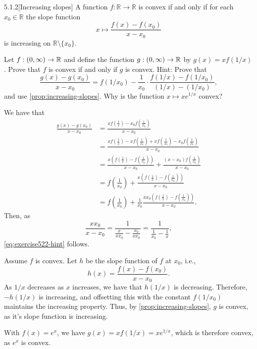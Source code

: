 \begin{manualprop}{5.1.2}[Increasing slopes]\label{prop:increasing-slopes}
  A function $f : \mathbb{R} \to \mathbb{R}$ is convex if and only if for each $x_0 \in \mathbb{R}$ the slope function
  \begin{equation}
    x \mapsto \frac{f(x)-f(x_0)}{x-x_0}
  \end{equation}
  is increasing on $\mathbb{R} \setminus \{x_0\}$.
\end{manualprop}

\begin{exercise}
  Let $f : (0, \infty) \to \mathbb{R}$ and define the function $g : (0, \infty) \to \mathbb{R}$ by $g(x) = x f(1 / x)$.
  Prove that $f$ is convex if and only if $g$ is convex.
  Hint: Prove that
  \begin{equation}\label{eq:exercise522-hint}
    \frac{g(x) - g(x_0)}{x - x_0}
    = f(1 / x_0) - \frac{1}{x_0} \cdot \frac{f(1 / x) - f(1 / x_0)}{(1 / x) - (1 / x_0)},
  \end{equation}
  and use \cref{prop:increasing-slopes}.
  Why is the function $x \mapsto x e^{1/x}$ convex?
\end{exercise}

\begin{solution}
  We have that
  \begin{align*}
    \frac{g(x) - g(x_0)}{x - x_0}
    &= \frac{x f(\frac{1}{x}) - x_0 f(\frac{1}{x_0})}{x - x_0} \\
    &= \frac{x f(\frac{1}{x}) - x f(\frac{1}{x_0}) + x f(\frac{1}{x_0}) - x_0 f(\frac{1}{x_0})}{x - x_0} \\
    &= \frac{x (f(\frac{1}{x}) - f(\frac{1}{x_0}))}{x - x_0} + \frac{(x - x_0) f(\frac{1}{x_0})}{x - x_0} \\
    &= f(\tfrac{1}{x_0}) + \frac{x (f(\frac{1}{x}) - f(\frac{1}{x_0}))}{x - x_0} \\
    &= f(\tfrac{1}{x_0}) + \frac{1}{x_0} \frac{x x_0 (f(\frac{1}{x}) - f(\frac{1}{x_0}))}{x - x_0}.
  \end{align*}
  Then, as
  \begin{equation*}
    \frac{x x_0}{x - x_0}
    = \frac{1}{\frac{x}{x x_0} - \frac{x_0}{x x_0}}
    = \frac{1}{\frac{1}{x_0} - \frac{1}{x}},
  \end{equation*}
  \cref{eq:exercise522-hint} follows.

  Assume $f$ is convex.
  Let $h$ be the slope function of $f$ at $x_0$, i.e.,
  \begin{equation}
    h(x) = \frac{f(x) - f(x_0)}{x - x_0}.
  \end{equation}
  As $1/x$ decreases as $x$ increases, we have that $h(1/x)$ is decreasing.
  Therefore, $-h(1/x)$ is increasing, and offsetting this with the constant $f(1/x_0)$ maintains the increasing property.
  Thus, by \cref{prop:increasing-slopes}, $g$ is convex, as it's slope function is increasing.

  With $f(x) = e^x$, we have $g(x) = x f(1/x) = x e^{1/x}$, which is therefore convex, as $e^x$ is convex.
\end{solution}

